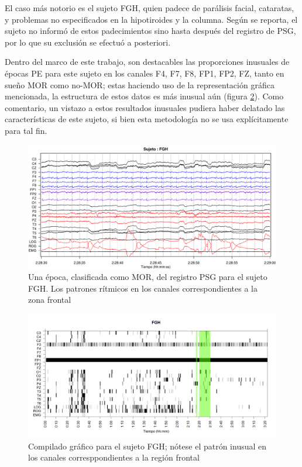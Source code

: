 \documentclass[12pt,a4paper]{mitthesis}
\begin{document}
El caso m\'as notorio es el sujeto FGH, quien padece de par\'alisis facial, cataratas, y problemas 
no especificados en la hipotiroides y la columna. Seg\'un se reporta, el sujeto no inform\'o de 
estos padecimientos sino hasta despu\'es del registro de PSG, por lo que su exclusi\'on se efectu\'o 
a posteriori.

Dentro del marco de este trabajo, son destacables las proporciones inusuales de \'epocas PE para 
este sujeto en los canales F4, F7, F8, FP1, FP2, FZ, tanto en sue\~no MOR como no-MOR; estas 
haciendo uso de la representaci\'on gr\'afica mencionada, la estructura de estos datos es m\'as
inusual a\'un (figura \ref{FGH_especial}).
Como comentario, un vistazo a estos resultados inusuales pudiera haber delatado las 
caracter\'isticas de este sujeto, si bien esta metodolog\'ia no se usa expl\'icitamente para tal 
fin.

\begin{figure}
\centering
\includegraphics[width=0.95\linewidth]
{./p_170511/FGH_297_PDG_lucirse_PSG.pdf} 
\caption{Una \'epoca, clasificada como MOR, del registro PSG para el sujeto FGH. Los patrones 
r\'itmicos en los canales correspondientes a la zona frontal}
\label{FGH_psg}
\end{figure}

\begin{figure}
\centering
\includegraphics[width=0.95\linewidth]
{./muypreeliminar170408/FGHSUE_est.png} 
\caption{Compilado gr\'afico para el sujeto FGH; n\'otese el patr\'on inusual en los canales
corresppondientes a la regi\'on frontal}
\label{FGH_especial}
\end{figure}
\end{document}
